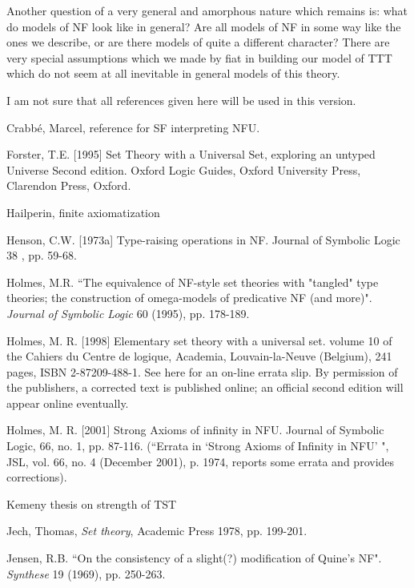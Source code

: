 \documentclass[112pt]{article}
\begin{document}
Another question of a very general and amorphous nature which remains is:  what do models of NF look like in general?  Are all models of NF in some way like the ones we describe, or are there models of quite a different character?  There are very special assumptions which we made by fiat in building our model of TTT which do  not seem at all inevitable in general models of this theory.

\newpage

I am not sure that all references given here will be used in this version.

\begin{thebibliography}{99}


  Crabb\'e, Marcel, reference for SF interpreting NFU.


  Forster, T.E. [1995] 
Set Theory with a Universal Set, exploring an untyped Universe 
Second edition. Oxford Logic Guides, Oxford University Press, Clarendon Press, Oxford.

 Hailperin, finite axiomatization

   Henson, C.W. [1973a] 
Type-raising operations in NF. 
Journal of Symbolic Logic 38 , pp. 59-68.

  Holmes, M.R.
``The equivalence of NF-style set theories with "tangled" type theories; the construction of omega-models of predicative NF (and more)". 
{\em Journal of Symbolic Logic\/} 60 (1995), pp. 178-189.

  Holmes, M. R. [1998] 
Elementary set theory with a universal set. 
volume 10 of the Cahiers du Centre de logique, Academia, Louvain-la-Neuve (Belgium), 241 pages, ISBN 2-87209-488-1. See here for an on-line errata slip. By permission of the publishers, a corrected text is published online; an official second edition will appear online eventually.

   Holmes, M. R. [2001]
Strong Axioms of infinity in NFU.
Journal of Symbolic Logic, 66, no. 1, pp. 87-116.  \newline(``Errata in `Strong
Axioms of Infinity in NFU' ", JSL, vol. 66, no. 4 (December
2001), p. 1974, reports some errata and provides corrections).

  Kemeny thesis on strength of TST

  Jech, Thomas, {\em Set theory}, Academic Press 1978, pp. 199-201.

  Jensen, R.B.
``On the consistency of a slight(?) modification of Quine's NF". 
{\em Synthese\/} 19 (1969), pp. 250-263.


\end{thebibliography}
\end{document}
